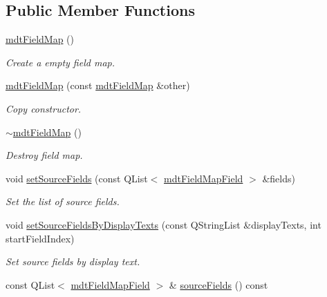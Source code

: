 \subsection*{Public Member Functions}
\begin{DoxyCompactItemize}
\item 
\hypertarget{classmdt_field_map_a7e255a2c818c495fe0b8c09ee1317bcd}{
\hyperlink{classmdt_field_map_a7e255a2c818c495fe0b8c09ee1317bcd}{mdtFieldMap} ()}
\label{classmdt_field_map_a7e255a2c818c495fe0b8c09ee1317bcd}

\begin{DoxyCompactList}\small\item\em Create a empty field map. \end{DoxyCompactList}\item 
\hypertarget{classmdt_field_map_a722a46d31ab6520ca280adae21a06b3f}{
\hyperlink{classmdt_field_map_a722a46d31ab6520ca280adae21a06b3f}{mdtFieldMap} (const \hyperlink{classmdt_field_map}{mdtFieldMap} \&other)}
\label{classmdt_field_map_a722a46d31ab6520ca280adae21a06b3f}

\begin{DoxyCompactList}\small\item\em Copy constructor. \end{DoxyCompactList}\item 
\hyperlink{classmdt_field_map_acb3e39f5f9cbc6047871000ae561a35e}{$\sim$mdtFieldMap} ()
\begin{DoxyCompactList}\small\item\em Destroy field map. \end{DoxyCompactList}\item 
\hypertarget{classmdt_field_map_ab9facc102ae7de535d4f54fabc5c6fd2}{
void \hyperlink{classmdt_field_map_ab9facc102ae7de535d4f54fabc5c6fd2}{setSourceFields} (const QList$<$ \hyperlink{classmdt_field_map_field}{mdtFieldMapField} $>$ \&fields)}
\label{classmdt_field_map_ab9facc102ae7de535d4f54fabc5c6fd2}

\begin{DoxyCompactList}\small\item\em Set the list of source fields. \end{DoxyCompactList}\item 
void \hyperlink{classmdt_field_map_a70fec473d6f335148722c311552710d2}{setSourceFieldsByDisplayTexts} (const QStringList \&displayTexts, int startFieldIndex)
\begin{DoxyCompactList}\small\item\em Set source fields by display text. \end{DoxyCompactList}\item 
\hypertarget{classmdt_field_map_a9fc54c201bbea18660f4e88675edf5cf}{
const QList$<$ \hyperlink{classmdt_field_map_field}{mdtFieldMapField} $>$ \& \hyperlink{classmdt_field_map_a9fc54c201bbea18660f4e88675edf5cf}{sourceFields} () const }
\label{classmdt_field_map_a9fc54c201bbea18660f4e88675edf5cf}


\end{DoxyCompactItemize}
